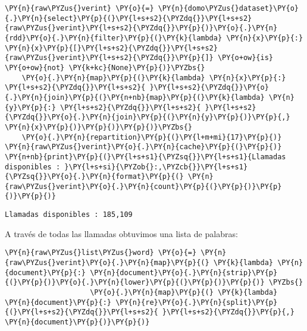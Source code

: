 \vspace{0.5cm}


    \begin{tcolorbox}[breakable, size=fbox, boxrule=1pt, pad at break*=1mm,colback=cellbackground, colframe=cellborder]
\begin{Verbatim}[commandchars=\\\{\}]
\PY{n}{raw\PYZus{}verint} \PY{o}{=} \PY{n}{domo\PYZus{}dataset}\PY{o}{.}\PY{n}{select}\PY{p}{(}\PY{l+s+s2}{\PYZdq{}}\PY{l+s+s2}{raw\PYZus{}verint}\PY{l+s+s2}{\PYZdq{}}\PY{p}{)}\PY{o}{.}\PY{n}{rdd}\PY{o}{.}\PY{n}{filter}\PY{p}{(}\PY{k}{lambda} \PY{n}{x}\PY{p}{:} \PY{n}{x}\PY{p}{[}\PY{l+s+s2}{\PYZdq{}}\PY{l+s+s2}{raw\PYZus{}verint}\PY{l+s+s2}{\PYZdq{}}\PY{p}{]} \PY{o+ow}{is} \PY{o+ow}{not} \PY{k+kc}{None}\PY{p}{)}\PYZbs{}
    \PY{o}{.}\PY{n}{map}\PY{p}{(}\PY{k}{lambda} \PY{n}{x}\PY{p}{:} \PY{l+s+s2}{\PYZdq{}}\PY{l+s+s2}{ }\PY{l+s+s2}{\PYZdq{}}\PY{o}{.}\PY{n}{join}\PY{p}{(}\PY{n+nb}{map}\PY{p}{(}\PY{k}{lambda} \PY{n}{y}\PY{p}{:} \PY{l+s+s2}{\PYZdq{}}\PY{l+s+s2}{ }\PY{l+s+s2}{\PYZdq{}}\PY{o}{.}\PY{n}{join}\PY{p}{(}\PY{n}{y}\PY{p}{)}\PY{p}{,} \PY{n}{x}\PY{p}{)}\PY{p}{)}\PY{p}{)}\PYZbs{}
    \PY{o}{.}\PY{n}{repartition}\PY{p}{(}\PY{l+m+mi}{17}\PY{p}{)}
\PY{n}{raw\PYZus{}verint}\PY{o}{.}\PY{n}{cache}\PY{p}{(}\PY{p}{)}
\PY{n+nb}{print}\PY{p}{(}\PY{l+s+s1}{\PYZsq{}}\PY{l+s+s1}{Llamadas disponibles : }\PY{l+s+si}{\PYZob{}:,\PYZcb{}}\PY{l+s+s1}{\PYZsq{}}\PY{o}{.}\PY{n}{format}\PY{p}{(} \PY{n}{raw\PYZus{}verint}\PY{o}{.}\PY{n}{count}\PY{p}{(}\PY{p}{)}\PY{p}{)}\PY{p}{)}  
\end{Verbatim}
\end{tcolorbox}

    \begin{Verbatim}[commandchars=\\\{\}]
Llamadas disponibles : 185,109
    \end{Verbatim}
    
    
 A través de todas las llamadas obtuvimos una lista de palabras: 
    \vspace{0.5cm}
    
        \begin{tcolorbox}[breakable, size=fbox, boxrule=1pt, pad at break*=1mm,colback=cellbackground, colframe=cellborder]
    \begin{Verbatim}[commandchars=\\\{\}]
    \PY{n}{raw\PYZus{}list\PYZus{}word} \PY{o}{=} \PY{n}{raw\PYZus{}verint}\PY{o}{.}\PY{n}{map}\PY{p}{(} \PY{k}{lambda} \PY{n}{document}\PY{p}{:} \PY{n}{document}\PY{o}{.}\PY{n}{strip}\PY{p}{(}\PY{p}{)}\PY{o}{.}\PY{n}{lower}\PY{p}{(}\PY{p}{)}\PY{p}{)} \PYZbs{}
                    \PY{o}{.}\PY{n}{map}\PY{p}{(} \PY{k}{lambda} \PY{n}{document}\PY{p}{:} \PY{n}{re}\PY{o}{.}\PY{n}{split}\PY{p}{(}\PY{l+s+s2}{\PYZdq{}}\PY{l+s+s2}{ }\PY{l+s+s2}{\PYZdq{}}\PY{p}{,} \PY{n}{document}\PY{p}{)}\PY{p}{)}
    \end{Verbatim}
    \end{tcolorbox}
    

